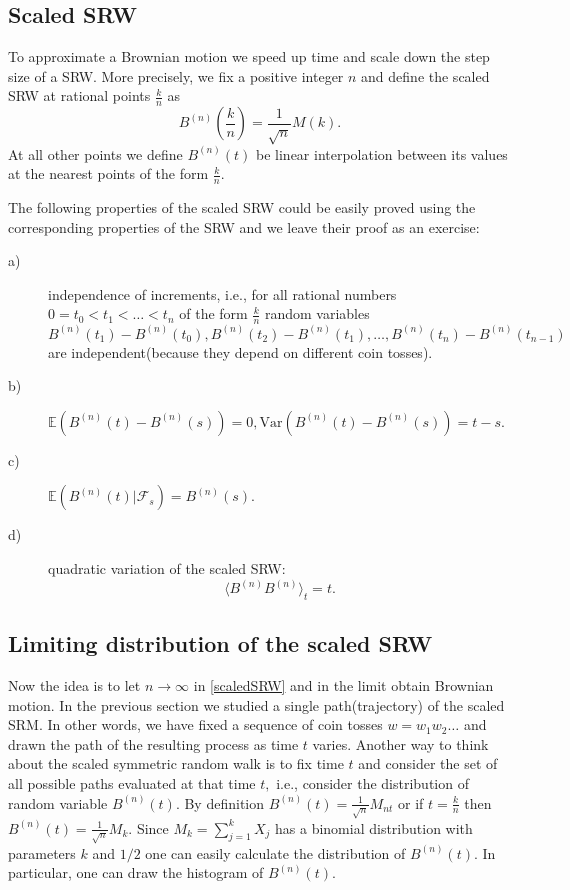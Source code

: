 \documentclass[reqno,psamsfonts, 10pt]{amsart}
\theoremstyle{remark}
\begin{document}
\subsection*{Scaled SRW}
To approximate a Brownian motion we speed up time and scale
down the step size of a SRW. More precisely, we fix a
positive integer $n$ and define the scaled SRW at rational
points $\frac{k}{n}$ as
\begin{equation}\label{scaledSRW}
B^{(n)}\left(\frac{k}{n}\right) = \frac{1}{\sqrt{n}} M(k).
\end{equation}
At all other points we define $B^{(n)}(t)$ be linear
interpolation between its values at the nearest points of
the form $\frac{k}{n}.$


The following properties of the scaled SRW could be easily
proved using the corresponding properties of the SRW and we
leave their proof as an exercise:

\begin{description}
\item[a)] independence of increments, i.e., for all
rational numbers $0 = t_0 < t_1 < \dots < t_n$ of the form
$\frac{k}{n}$ random variables
\begin{equation}
B^{(n)}(t_1) - B^{(n)}(t_0), B^{(n)}(t_2) - B^{(n)}(t_1),
\dots, B^{(n)}(t_n) - B^{(n)}(t_{n-1})
\end{equation}
are independent(because they depend on different coin
tosses).

\item[b)] $\mathbb{E}(B^{(n)}(t) - B^{(n)}(s)) = 0,
\mbox{Var} (B^{(n)}(t) - B^{(n)}(s)) = t - s.$

\item[c)] $\mathbb{E}(B^{(n)}(t)| \mathcal{F}_s) =
B^{(n)}(s).$

\item[d)] quadratic variation of the scaled SRW:
\begin{equation*}
\langle B^{(n)} B^{(n)}\rangle_t = t.
\end{equation*}

\end{description}


\subsection*{Limiting distribution of the scaled SRW}

Now the idea is to let $n \to \infty$ in \eqref{scaledSRW}
and in the limit obtain Brownian motion. In the previous
section we studied a single path(trajectory) of the scaled
SRM. In other words, we have fixed a sequence of coin
tosses $w = w_1 w_2 \dots$ and drawn the path of the
resulting process as time $t$ varies. Another way to think
about the scaled symmetric random walk is to fix time $t$
and consider the set of all possible paths evaluated at
that time $t,$ i.e., consider the distribution of random
variable $B^{(n)}(t).$ By definition $B^{(n)}(t) =
\frac{1}{\sqrt{n}} M_{nt}$ or if $t = \frac{k}{n}$ then
$B^{(n)}(t) = \frac{1}{\sqrt{n}} M_k.$ Since $M_k = \sum
\limits_{j=1}^k X_j$ has a binomial distribution with
parameters $k$ and $1/2$ one can easily calculate the
distribution of $B^{(n)}(t).$ In particular, one can draw
the histogram of $B^{(n)}(t).$
\end{document}

